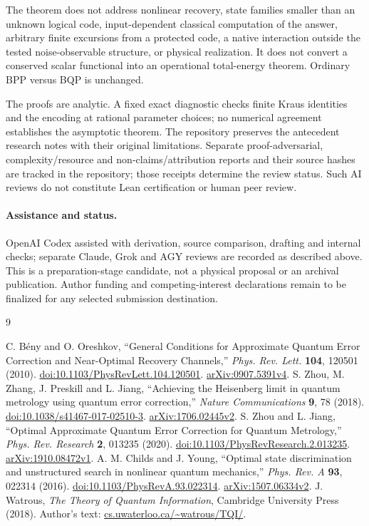 \documentclass[11pt]{article}
\begin{document}
The theorem does not address nonlinear recovery, state families smaller than an unknown logical code, input-dependent classical computation of the answer, arbitrary finite excursions from a protected code, a native interaction outside the tested noise-observable structure, or physical realization. It does not convert a conserved scalar functional into an operational total-energy theorem. Ordinary BPP versus BQP is unchanged.

The proofs are analytic. A fixed exact diagnostic checks finite Kraus identities and the encoding at rational parameter choices; no numerical agreement establishes the asymptotic theorem. The repository preserves the antecedent research notes with their original limitations. Separate proof-adversarial, complexity/resource and non-claims/attribution reports and their source hashes are tracked in the repository; those receipts determine the review status. Such AI reviews do not constitute Lean certification or human peer review.

\paragraph{Assistance and status.} OpenAI Codex assisted with derivation, source comparison, drafting and internal checks; separate Claude, Grok and AGY reviews are recorded as described above. This is a preparation-stage candidate, not a physical proposal or an archival publication. Author funding and competing-interest declarations remain to be finalized for any selected submission destination.

\begin{thebibliography}{9}
\raggedright
{} C. B\'eny and O. Oreshkov, ``General Conditions for Approximate Quantum Error Correction and Near-Optimal Recovery Channels,'' \emph{Phys. Rev. Lett.} \textbf{104}, 120501 (2010). \href{https://doi.org/10.1103/PhysRevLett.104.120501}{doi:10.1103/PhysRevLett.104.120501}. \href{https://arxiv.org/abs/0907.5391v4}{arXiv:0907.5391v4}.
 S. Zhou, M. Zhang, J. Preskill and L. Jiang, ``Achieving the Heisenberg limit in quantum metrology using quantum error correction,'' \emph{Nature Communications} \textbf{9}, 78 (2018). \href{https://doi.org/10.1038/s41467-017-02510-3}{doi:10.1038/s41467-017-02510-3}. \href{https://arxiv.org/abs/1706.02445v2}{arXiv:1706.02445v2}.
 S. Zhou and L. Jiang, ``Optimal Approximate Quantum Error Correction for Quantum Metrology,'' \emph{Phys. Rev. Research} \textbf{2}, 013235 (2020). \href{https://doi.org/10.1103/PhysRevResearch.2.013235}{doi:10.1103/PhysRevResearch.2.013235}. \href{https://arxiv.org/abs/1910.08472v1}{arXiv:1910.08472v1}.
 A. M. Childs and J. Young, ``Optimal state discrimination and unstructured search in nonlinear quantum mechanics,'' \emph{Phys. Rev. A} \textbf{93}, 022314 (2016). \href{https://doi.org/10.1103/PhysRevA.93.022314}{doi:10.1103/PhysRevA.93.022314}. \href{https://arxiv.org/abs/1507.06334v2}{arXiv:1507.06334v2}.
 J. Watrous, \emph{The Theory of Quantum Information}, Cambridge University Press (2018). Author's text: \href{https://cs.uwaterloo.ca/~watrous/TQI/}{cs.uwaterloo.ca/\textasciitilde watrous/TQI/}.
\end{thebibliography}
\end{document}
